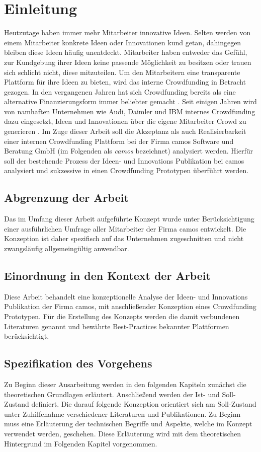 
\chapter{Einleitung}
Heutzutage haben immer mehr Mitarbeiter innovative Ideen. Selten werden von einem Mitarbeiter konkrete Ideen oder Innovationen kund getan, dahingegen bleiben diese Ideen häufig unentdeckt. Mitarbeiter haben entweder das Gefühl, zur Kundgebung ihrer Ideen keine passende Möglichkeit zu besitzen oder trauen sich schlicht nicht, diese mitzuteilen. Um den Mitarbeitern eine transparente Plattform für ihre Ideen zu bieten, wird das interne Crowdfunding in Betracht gezogen. In den vergangenen Jahren hat sich Crowdfunding bereits als eine alternative Finanzierungsform immer beliebter gemacht \cite{tableofvisions}. Seit einigen Jahren wird von namhaften Unternehmen wie Audi, Daimler und IBM internes Crowdfunding dazu eingesetzt, Ideen und Innovationen über die eigene Mitarbeiter Crowd zu generieren \cites{innosabi, crowdfunding}. Im Zuge dieser Arbeit soll die Akzeptanz als auch Realisierbarkeit einer internen Crowdfunding Plattform bei der Firma camos Software und Beratung GmbH (im Folgenden als \emph{camos} bezeichnet) analysiert werden. Hierfür soll der bestehende Prozess der Ideen- und Innovations Publikation bei camos analysiert und sukzessive in einen Crowdfunding Prototypen überführt werden.

\section{Abgrenzung der Arbeit}
Das im Umfang dieser Arbeit aufgeführte Konzept wurde unter Berücksichtigung einer ausführlichen Umfrage aller Mitarbeiter der Firma camos entwickelt. Die Konzeption ist daher spezifisch auf das Unternehmen zugeschnitten und nicht zwangsläufig allgemeingültig anwendbar. 

\section{Einordnung in den Kontext der Arbeit}
Diese Arbeit behandelt eine konzeptionelle Analyse der Ideen- und Innovations Publikation der Firma camos, mit anschließender Konzeption eines Crowdfunding Prototypen. Für die Erstellung des Konzepts werden die damit verbundenen Literaturen genannt und bewährte Best-Practices bekannter Plattformen berücksichtigt.

\section{Spezifikation des Vorgehens}
Zu Beginn dieser Ausarbeitung werden in den folgenden Kapiteln zunächst die theoretischen Grundlagen erläutert. Anschließend werden der Ist- und Soll-Zustand definiert. Die darauf folgende Konzeption orientiert sich am Soll-Zustand unter Zuhilfenahme verschiedener Literaturen und Publikationen. Zu Beginn muss eine Erläuterung der technischen Begriffe und Aspekte, welche im Konzept verwendet werden, geschehen. Diese Erläuterung wird mit dem theoretischen Hintergrund im Folgenden Kapitel vorgenommen.